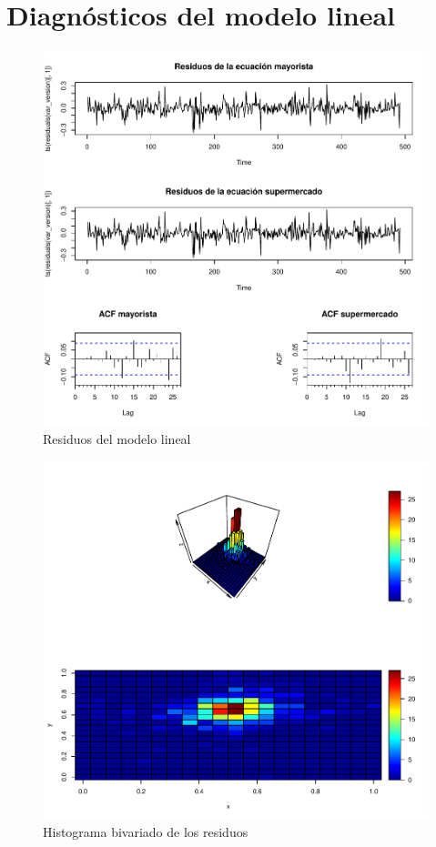 \section{Diagnósticos del modelo lineal}

\begin{figure}[H]
\centering
\caption{Residuos del modelo lineal}
\includegraphics[scale=0.7]{fig_results/fig4.pdf}
\end{figure}

\begin{figure}[H]
\centering
\caption{Histograma bivariado de los residuos}
\includegraphics[scale=0.7]{fig_results/fig5.pdf}
\end{figure}


